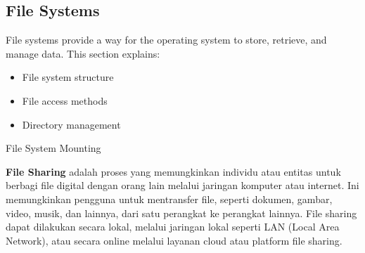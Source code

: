 \documentclass[12pt]{article}
\begin{document}
\subsection{File Systems}
File systems provide a way for the operating system to store, retrieve, and manage data. This section explains:
\begin{itemize}
    \item File system structure
    \item File access methods
    \item Directory management
\end{itemize}
\item File System Mounting 
\item \textbf{File Sharing} adalah proses yang memungkinkan individu atau entitas untuk berbagi file digital dengan orang lain melalui jaringan komputer atau internet. Ini memungkinkan pengguna untuk mentransfer file, seperti dokumen, gambar, video, musik, dan lainnya, dari satu perangkat ke perangkat lainnya. File sharing dapat dilakukan secara lokal, melalui jaringan lokal seperti LAN (Local Area Network), atau secara online melalui layanan cloud atau platform file sharing.
\end{document}
